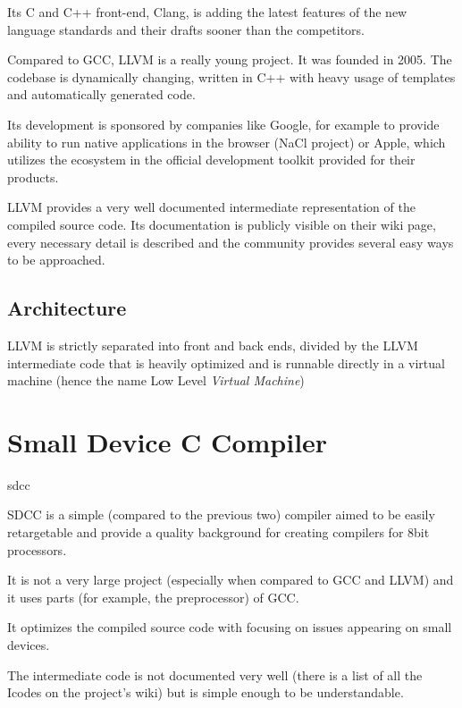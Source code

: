     Its C and C++ front-end, Clang, is adding the latest features of the new language standards and their drafts sooner than the competitors.

    Compared to GCC, LLVM is a really young project. It was founded in 2005. The codebase is dynamically changing, written in C++ with heavy usage of templates and automatically generated code.

    Its development is sponsored by companies like Google, for example to provide ability to run native applications in the browser (NaCl project) or Apple, which utilizes the ecosystem in the official development toolkit provided for their products.

    LLVM provides a very well documented intermediate representation of the compiled source code. Its documentation is publicly visible on their wiki page, every necessary detail is described and the community provides several easy ways to be approached.

        \subsection{Architecture}

        LLVM is strictly separated into front and back ends, divided by the LLVM intermediate code that is heavily optimized and is runnable directly in a virtual machine (hence the name Low Level \emph{Virtual Machine})

    \section{Small Device C Compiler}{sdcc}

    SDCC is a simple (compared to the previous two) compiler aimed to be easily retargetable and provide a quality background for creating compilers for 8bit processors.

    It is not a very large project (especially when compared to GCC and LLVM) and it uses parts (for example, the preprocessor) of GCC.

    It optimizes the compiled source code with focusing on issues appearing on small devices.

    The intermediate code is not documented very well (there is a list of all the Icodes on the project's wiki) but is simple enough to be understandable.


